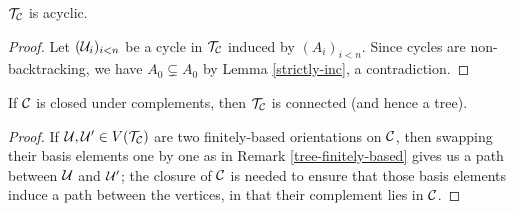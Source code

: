 \documentclass{amsart}
\begin{document}
    \begin{proposition}\label{acyclic}
        $\mathcal{T}_{\mathcal{C}}$ is acyclic.
    \end{proposition}
    \begin{proof}
        Let $(\mathcal{U}_i)_{i<n}$ be a cycle in $\mathcal{T}_{\mathcal{C}}$ induced by $(A_i)_{i<n}$. Since cycles are non-backtracking, we have $A_0\subsetneq A_0$ by Lemma \ref{strictly-inc}, a contradiction.
    \end{proof}

    \begin{proposition}\label{tree}
        If $\mathcal{C}$ is closed under complements, then $\mathcal{T}_{\mathcal{C}}$ is connected (and hence a tree).
    \end{proposition}
    \begin{proof}
        If $\mathcal{U},\mathcal{U}'\in V(\mathcal{T}_{\mathcal{C}})$ are two finitely-based orientations on $\mathcal{C}$, then swapping their basis elements one by one as in Remark \ref{tree-finitely-based} gives us a path between $\mathcal{U}$ and $\mathcal{U}'$; the closure of $\mathcal{C}$ is needed to ensure that those basis elements induce a path between the vertices, in that their complement lies in $\mathcal{C}$.
    \end{proof}
\end{document}
